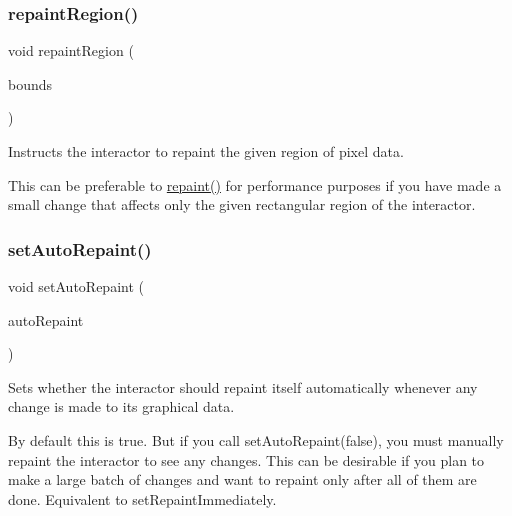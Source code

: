 \subsubsection{\texorpdfstring{repaint\+Region()}{repaintRegion()}\hspace{0.1cm}{\footnotesize\ttfamily [2/2]}}
{\footnotesize\ttfamily void repaint\+Region (\begin{DoxyParamCaption}\item[{const \mbox{\hyperlink{structsgl_1_1GRectangle}{G\+Rectangle}} \&}]{bounds }\end{DoxyParamCaption})\hspace{0.3cm}{\ttfamily [virtual]}}



Instructs the interactor to repaint the given region of pixel data. 

This can be preferable to \mbox{\hyperlink{classsgl_1_1GDrawingSurface_a4a8ae47b42f1e6a41b65d3546df46218}{repaint()}} for performance purposes if you have made a small change that affects only the given rectangular region of the interactor. \mbox{\label{classsgl_1_1GDrawingSurface_adf10848319457bd6df4c657bf8872bee}} 
\subsubsection{\texorpdfstring{set\+Auto\+Repaint()}{setAutoRepaint()}}
{\footnotesize\ttfamily void set\+Auto\+Repaint (\begin{DoxyParamCaption}\item[{bool}]{auto\+Repaint }\end{DoxyParamCaption})\hspace{0.3cm}{\ttfamily [virtual]}}



Sets whether the interactor should repaint itself automatically whenever any change is made to its graphical data. 

By default this is true. But if you call set\+Auto\+Repaint(false), you must manually repaint the interactor to see any changes. This can be desirable if you plan to make a large batch of changes and want to repaint only after all of them are done. Equivalent to set\+Repaint\+Immediately. 

